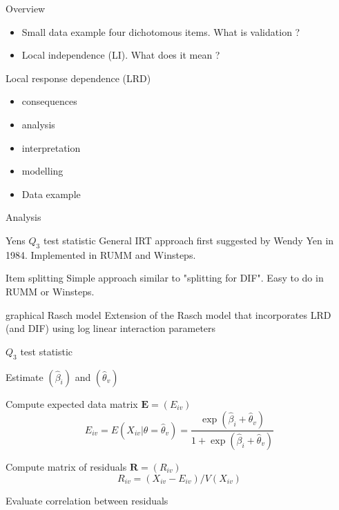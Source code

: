 \documentclass[xcolor=table]{beamer}
\begin{document}
\begin{frame}{Overview}
\begin{itemize}
\item[\checkmark] Small data example four dichotomous items. What is validation ?
\item[\checkmark] Local independence (LI). What does it mean ?
\end{itemize}
\begin{block}{Local response dependence (LRD)}
\begin{itemize}
\item[\checkmark] consequences
\item[O] analysis
\item[O] interpretation 
\item[O] modelling 
\end{itemize}
\end{block}
\begin{itemize}
\item[O] Data example
\end{itemize}
\end{frame}

\begin{frame}{Analysis}
\begin{block}{Yens $Q_3$ test statistic}
General IRT approach first suggested by Wendy Yen in 1984. Implemented in RUMM and Winsteps.
\end{block}
\pause
\begin{block}{Item splitting}
Simple approach similar to "splitting for DIF". Easy to do in RUMM or Winsteps.
\end{block}
\pause
\begin{block}{graphical Rasch model}
Extension of the Rasch model that incorporates LRD (and DIF) using log linear interaction parameters
\end{block} 
\end{frame}

\begin{frame}{$Q_3$ test statistic}
\pause
\begin{block}{Estimate}
$(\hat\beta_i)$ and $(\hat\theta_v)$
\end{block}
\pause
\begin{block}{Compute expected data matrix $\boldsymbol{E}=(E_{iv})$} 
$$
E_{iv}=E(X_{iv}|\theta=\hat\theta_v)=\frac{\exp(\hat\beta_i+\hat\theta_v)}{1+\exp(\hat\beta_i+\hat\theta_v)}
$$ 
\end{block}
\pause
\begin{block}{Compute matrix of residuals $\boldsymbol{R}=(R_{iv})$} 
$$
R_{iv}=(X_{iv}-E_{iv})/V(X_{iv})
$$
\end{block}
\pause
\begin{block}{Evaluate} 
correlation between residuals
\end{block}
\end{frame}
\end{document}
